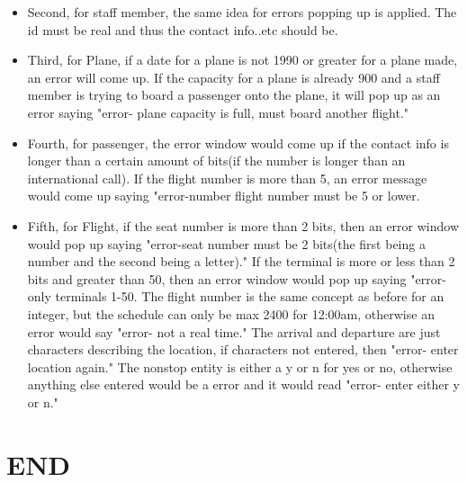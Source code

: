 \documentclass[10pt,conference]{IEEEtran}
\begin{document}
\begin{itemize} \item{Second, for staff member, the same idea for errors popping up is applied. The id must be real and thus the contact info..etc should be.} \end{itemize}

\begin{itemize} \item{Third, for Plane, if a date for a plane is not 1990 or greater for a plane made, an error will come up. If the capacity for a plane is already 900 and a staff member is trying to board a passenger onto the plane, it will pop up as an error saying "error- plane capacity is full, must board another flight."} \end{itemize}

\begin{itemize} \item{Fourth, for passenger, the error window would come up if the contact info is longer than a certain amount of bits(if the number is longer than an international call). If the flight number is more than 5, an error message would come up saying "error-number flight number must be 5 or lower.} \end{itemize}

\begin{itemize} \item{Fifth, for Flight, if the seat number is more than 2 bits, then an error window would pop up saying "error-seat number must be 2 bits(the first being a number and the second being a letter)." If the terminal is more or less than 2 bits and greater than 50, then an error window would pop up saying "error- only terminals 1-50. The flight number is the same concept as before for an integer, but the schedule can only be max 2400 for 12:00am, otherwise an error would say "error- not a real time." The arrival and departure are just characters describing the location, if characters not entered, then "error- enter location again." The nonstop entity is either a y or n for yes or no, otherwise anything else entered would be a error and it would read "error- enter either y or n."} \end{itemize}






\section{END}\label{sec:7. Project Highlights.}




%
%
\end{document}
